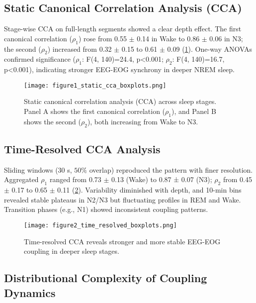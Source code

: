 \subsection{Static Canonical Correlation Analysis (CCA)}

Stage-wise CCA on full-length segments showed a clear depth effect. The first canonical correlation ($\rho_1$) rose from 0.55 $\pm$ 0.14 in Wake to 0.86 $\pm$ 0.06 in N3; the second ($\rho_2$) increased from 0.32 $\pm$ 0.15 to 0.61 $\pm$ 0.09 (\ref{fig:figure1}). One-way ANOVAs confirmed significance ($\rho_1$: F(4, 140)=24.4, p<0.001; $\rho_2$: F(4, 140)=16.7, p<0.001), indicating stronger EEG-EOG synchrony in deeper NREM sleep.

\begin{figure}
\centering
\texttt{[image: figure1\_static\_cca\_boxplots.png]} %
\caption{Static canonical correlation analysis (CCA) across sleep stages. Panel A shows the first canonical correlation ($\rho_1$), and Panel B shows the second ($\rho_2$), both increasing from Wake to N3.}\label{fig:figure1}
\end{figure}

\subsection{Time-Resolved CCA Analysis}

Sliding windows (30 s, $50\%$ overlap) reproduced the pattern with finer resolution. Aggregated $\rho_1$ ranged from 0.73 $\pm$ 0.13 (Wake) to 0.87 ± 0.07 (N3); $\rho_2$ from 0.45 $\pm$ 0.17 to 0.65 $\pm$ 0.11 (\ref{fig:figure2}). Variability diminished with depth, and 10-min bins revealed stable plateaus in N2/N3 but fluctuating profiles in REM and Wake. Transition phases (e.g., N1) showed inconsistent coupling patterns.

\begin{figure}
\centering
\texttt{[image: figure2\_time\_resolved\_boxplots.png]} %
\caption{Time-resolved CCA reveals stronger and more stable EEG-EOG coupling in deeper sleep stages.}\label{fig:figure2}
\end{figure}

\subsection{Distributional Complexity of Coupling Dynamics}

